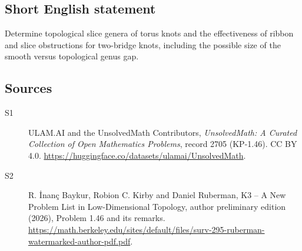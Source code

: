 \documentclass[11pt]{article}
\begin{document}
\subsection{Short English statement}
Determine topological slice genera of torus knots and the effectiveness of ribbon and slice obstructions for two-bridge knots, including the possible size of the smooth versus topological genus gap.
\subsection{Sources}
\begin{description}
\item[\hypertarget{source:2705:1}{S1}] ULAM.AI and the UnsolvedMath Contributors, \emph{UnsolvedMath: A Curated Collection of Open Mathematics Problems}, record 2705 (KP-1.46). CC BY 4.0. \url{https://huggingface.co/datasets/ulamai/UnsolvedMath}.
\item[\hypertarget{source:2705:2}{S2}] R. \.{I}nan\c{c} Baykur, Robion C. Kirby and Daniel Ruberman, K3 -- A New Problem List in Low-Dimensional Topology, author preliminary edition (2026), Problem 1.46 and its remarks. \url{https://math.berkeley.edu/sites/default/files/surv-295-ruberman-watermarked-author-pdf.pdf}.
\end{description}
\label{end:2705}
\end{document}
